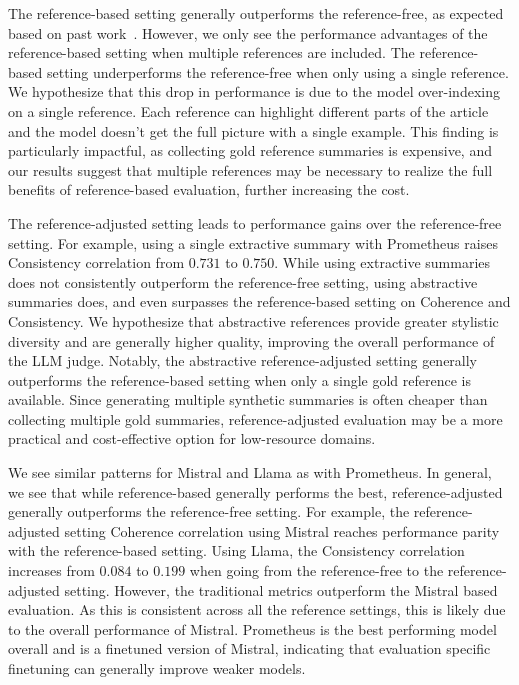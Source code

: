 The reference-based setting generally outperforms the reference-free, as expected based on past work~\cite{zheng2023judging,kim2023prometheus}. However, we only see the performance advantages of the reference-based setting when multiple references are included. The reference-based setting underperforms the reference-free when only using a single reference. We hypothesize that this drop in performance is due to the model over-indexing on a single reference. Each reference can highlight different parts of the article and the model doesn't get the full picture with a single example. 
This finding is particularly impactful, as collecting gold reference summaries is expensive, and our results suggest that multiple references may be necessary to realize the full benefits of reference-based evaluation, further increasing the cost. 

The reference-adjusted setting leads to performance gains over the reference-free setting. For example, using a single extractive summary with Prometheus raises Consistency correlation from $0.731$ to $0.750$. While using extractive summaries does not consistently outperform the reference-free setting, using abstractive summaries does, and even surpasses the reference-based setting on Coherence and Consistency. We hypothesize that abstractive references provide greater stylistic diversity and are generally higher quality, improving the overall performance of the LLM judge. Notably, the abstractive reference-adjusted setting generally outperforms the reference-based setting when only a single gold reference is available. Since generating multiple synthetic summaries is often cheaper than collecting multiple gold summaries, reference-adjusted evaluation may be a more practical and cost-effective option for low-resource domains.




We see similar patterns for Mistral and Llama as with Prometheus. In general, we see that while reference-based generally performs the best, reference-adjusted generally outperforms the reference-free setting. For example, the reference-adjusted setting Coherence correlation using Mistral reaches performance parity with the reference-based setting. Using Llama, the Consistency correlation increases from $0.084$ to $0.199$ when going from the reference-free to the reference-adjusted setting. However,  the traditional metrics outperform the Mistral based evaluation. As this is consistent across all the reference settings, this is likely due to the overall performance of Mistral. Prometheus is the best performing model overall and is a finetuned version of Mistral, indicating that evaluation specific finetuning can generally improve weaker models.
